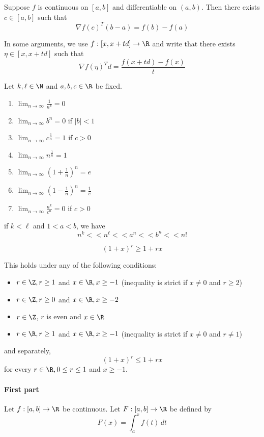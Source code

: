 Suppose $f$ is continuous on $[a,b]$ and differentiable on $(a,b)$.
Then there exists $c\in[a,b]$ such that
$$
	\nabla f(c)^T(b-a)=f(b)-f(a)
$$

In some arguments, we use $f:[x,x+td]\to\R$ and write that there
exists $\eta\in[x,x+td]$ such that
$$
	\nabla f(\eta)^Td=\frac{f(x+td)-f(x)}t
$$

\label{ffc8953}

Let $k,\ell\in\N$ and $a,b,c\in\R$ be fixed.
\begin{enumerate}[label=(\alph*)]
	\def\li{\displaystyle\lim_{n\to\infty}}
	\item $\li\frac1{n^k}=0$
	\item $\li b^n=0$ \quad if \quad $|b|<1$
	\item $\li c^{\frac1n}=1$ \quad if \quad $c>0$
	\item $\li n^{\frac1n}=1$
	\item $\li \left(1+\frac1n\right)^n=e$
	\item $\li \left(1-\frac1n\right)^n=\frac1e$
	\item $\li \frac{n^k}{c^n}=0$ \quad if \quad $c>0$
\end{enumerate}

if $k<\ell$ and $1<a<b$, we have
$$
	n^k << n^\ell << a^n << b^n << n!
$$

\label{d44713f}

$$
	(1+x)^r\geq 1+rx
$$

This holds under any of the following conditions:
\begin{itemize}
	\item $r\in\Z,r\geq1$ and $x\in\R,x\geq-1$ (inequality is strict if
	      $x\neq0$ and $r\geq2$)
	\item $r\in\Z,r\geq0$ and $x\in\R,x\geq-2$
	\item $r\in\Z$, $r$ is even and $x\in\R$
	\item $r\in\R,r\geq1$ and $x\in\R,x\geq-1$ (inequality is strict if
	      $x\neq0$ and $r\neq1$)
\end{itemize}

and separately,
$$
	(1+x)^r\leq 1+rx
$$
for every $r\in\R,0\leq r\leq 1$ and $x\geq-1$.

\label{b869dc0}

\paragraph{First part} Let $f:[a,b]\to\R$ be continuous. Let
$F:[a,b]\to\R$ be defined by
$$F(x)=\int_a^xf(t)\,dt$$

